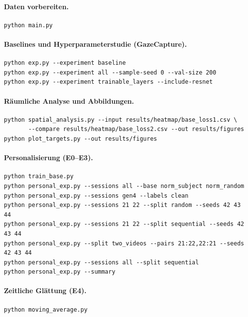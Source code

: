 \paragraph{Daten vorbereiten.}
\begin{verbatim}
python main.py
\end{verbatim}

\paragraph{Baselines und Hyperparameterstudie (GazeCapture).}
\begin{verbatim}
python exp.py --experiment baseline
python exp.py --experiment all --sample-seed 0 --val-size 200
python exp.py --experiment trainable_layers --include-resnet
\end{verbatim}

\paragraph{Räumliche Analyse und Abbildungen.}
\begin{verbatim}
python spatial_analysis.py --input results/heatmap/base_loss1.csv \
       --compare results/heatmap/base_loss2.csv --out results/figures
python plot_targets.py --out results/figures
\end{verbatim}

\paragraph{Personalisierung (E0--E3).}
\begin{verbatim}
python train_base.py
python personal_exp.py --sessions all --base norm_subject norm_random
python personal_exp.py --sessions gen4 --labels clean
python personal_exp.py --sessions 21 22 --split random --seeds 42 43 44
python personal_exp.py --sessions 21 22 --split sequential --seeds 42 43 44
python personal_exp.py --split two_videos --pairs 21:22,22:21 --seeds 42 43 44
python personal_exp.py --sessions all --split sequential
python personal_exp.py --summary
\end{verbatim}

\paragraph{Zeitliche Glättung (E4).}
\begin{verbatim}
python moving_average.py
\end{verbatim}

